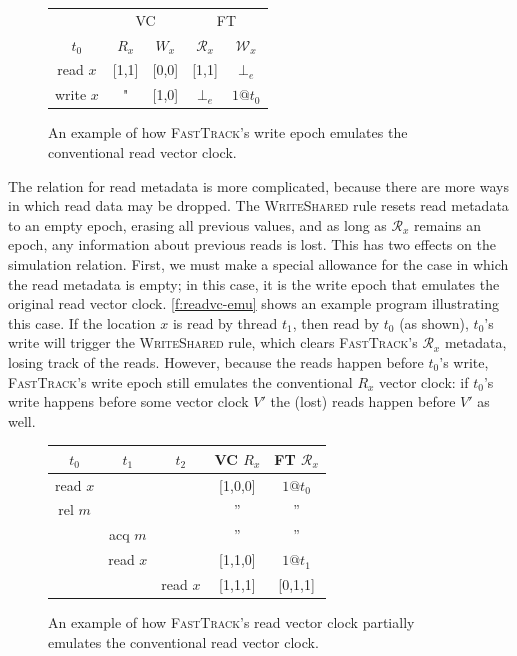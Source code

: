 \documentclass[preprint, 9pt]{sigplanconf}
\newcommand{\Tid}{t}
\newcommand{\Address}{x}
\newcommand{\Lock}{m}
\newcommand{\VC}{V}
\newcommand{\VCFont}{}
\newcommand{\ReadVC}[1]{\VCFont{R}_{#1}}
\newcommand{\WriteVC}[1]{\VCFont{W}_{#1}}
\newcommand{\FT}{\textsc{FastTrack}\xspace}
\newcommand{\Rule}[1]{\textsc{#1}}
\newcommand{\EmptyEpoch}{\bot_e}
\begin{document}
\begin{figure}[t]
\centering
\begin{tabular}{c|cc|cc|}
& \multicolumn{2}{c}{VC} & \multicolumn{2}{c}{FT} \\
$\Tid_0$ & $\ReadVC{\Address}$ & $\WriteVC{\Address}$ & $\mathcal{R}_{\Address}$ & $\mathcal{W}_{\Address}$ \\
\hline
read $\Address$ & [1,1] & [0,0] & [1,1] & $\EmptyEpoch$ \\
write $\Address$ & " & [1,0] & $\EmptyEpoch$ & $1@t_0$ \\
\end{tabular}
\caption{An example of how \FT's write epoch emulates the conventional read vector clock.}
\label{f:readvc-emu}
\end{figure}

The relation for read metadata is more complicated, because there are more ways in which read data may be dropped. The \Rule{WriteShared} rule resets read metadata to an empty epoch, erasing all previous values, and as long as $\mathcal{R}_x$ remains an epoch, any information about previous reads is lost. This has two effects on the simulation relation. First, we must make a special allowance for the case in which the read metadata is empty; in this case, it is the write epoch that emulates the original read vector clock. \autoref{f:readvc-emu} shows an example program illustrating this case. If the location $\Address$ is read by thread $\Tid_1$, then read by $\Tid_0$ (as shown), $\Tid_0$'s write will trigger the \Rule{WriteShared} rule, which clears \FT's $\mathcal{R}_x$ metadata, losing track of the reads. However, because the reads happen before $\Tid_0$'s write, \FT's write epoch still emulates the conventional $R_x$ vector clock: if $\Tid_0$'s write happens before some vector clock $\VC'$ the (lost) reads happen before $\VC'$ as well.

\begin{figure}[t]
\centering
\begin{tabular}{ccc|c|c|}
$\Tid_0$ & $\Tid_1$ & $\Tid_2$ & VC $\ReadVC{\Address}$ & FT $\mathcal{R}_{\Address}$ \\
\hline
read $\Address$ & &      & [1,0,0] & $1@t_0$\\
rel $\Lock$ & &      &''&''\\
& acq $\Lock$ &      &''&''\\
& read $\Address$ &      &[1,1,0]&$1@t_1$\\
& & read $\Address$      &[1,1,1]&[0,1,1]\\
\end{tabular}
\caption{An example of how \FT's read vector clock partially emulates the conventional read vector clock.}
\label{f:partial-emu}
\end{figure}
\end{document}
